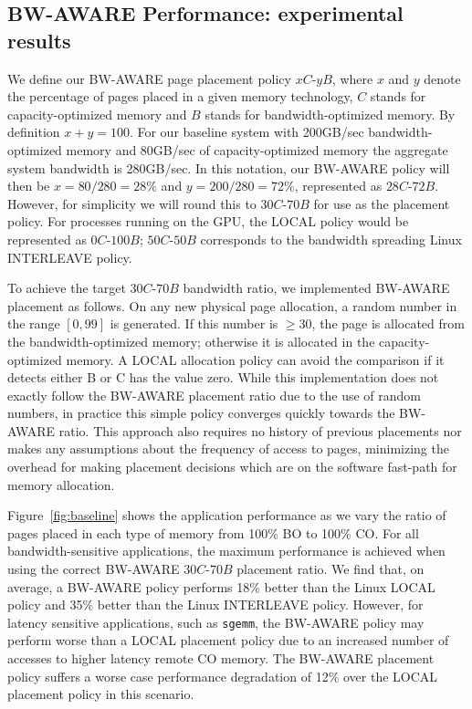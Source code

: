 \subsection{BW-AWARE Performance: experimental results}
We define our BW-AWARE page placement policy $xC$-$yB$, where $x$ and $y$ denote the
percentage of pages placed in a given memory technology, $C$ stands for capacity-optimized
memory and $B$ stands for bandwidth-optimized memory. By definition $x+y=100$. For our baseline
system with 200GB/sec bandwidth-optimized memory and 80GB/sec of capacity-optimized memory the
aggregate system bandwidth is 280GB/sec.  In this
notation, our BW-AWARE policy will then be $x=80/280=28\%$ and $y=200/280=72\%$, represented as
$28C$-$72B$. However, for simplicity we will round this to $30C$-$70B$ for use as the 
placement policy.  For processes running on the GPU, the LOCAL policy
would be represented as $0C$-$100B$; $50C$-$50B$ corresponds to the bandwidth spreading Linux
INTERLEAVE policy.

To achieve the target $30C$-$70B$ bandwidth ratio, we implemented BW-AWARE placement as follows.
On any new physical page allocation, a random number in the range $[0,99]$
is generated.  If this number is $\geq30$, the page is allocated from the bandwidth-optimized memory; 
otherwise it is allocated in the capacity-optimized memory. A LOCAL allocation policy can avoid the
comparison if it detects either B or C has the value zero.  While this implementation does
not exactly follow the BW-AWARE placement ratio due to the use of random numbers, in practice this 
simple policy converges quickly towards the BW-AWARE ratio.  This approach also requires no history
of previous placements {\color{black} nor makes any assumptions about the frequency of access to pages}, 
minimizing the overhead for making placement decisions which are on the 
software fast-path for memory allocation.

Figure~\ref{fig:baseline} shows the application performance as we vary the ratio of pages placed in 
each type of memory from 100\% BO to 100\% CO\@. 
For all bandwidth-sensitive applications, the maximum performance is
achieved when using the correct BW-AWARE $30C$-$70B$ placement ratio.  We
find that, on average, a BW-AWARE policy performs 18\% better than the Linux
LOCAL policy and 35\% better than the Linux INTERLEAVE policy. However, for latency sensitive
applications, such as {\tt sgemm}, the BW-AWARE policy may perform worse than a LOCAL
placement policy due to an increased number of accesses to higher latency remote
CO memory. The BW-AWARE placement policy suffers a worse case performance degradation of
12\% over the LOCAL placement policy in this scenario.

